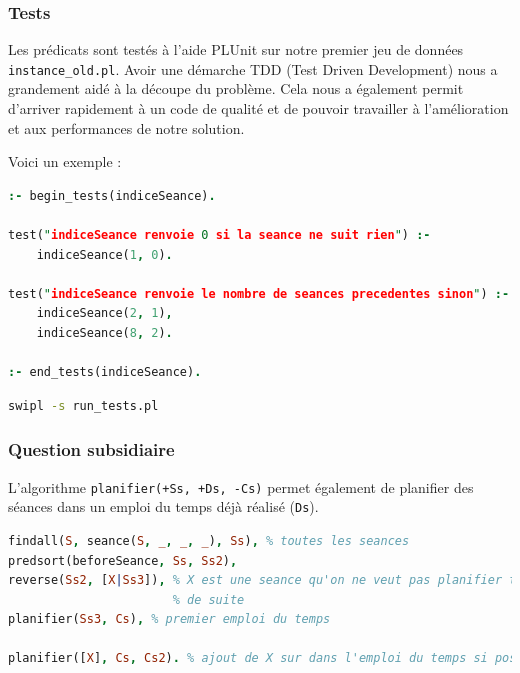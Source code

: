 \subsubsection{Tests}

Les prédicats sont testés à l'aide PLUnit sur notre premier jeu de données
\texttt{instance\_old.pl}. Avoir une démarche TDD (Test Driven Development) nous
a grandement aidé à la découpe du problème. Cela nous a également permit
d'arriver rapidement à un code de qualité et de pouvoir travailler à
l'amélioration et aux performances de notre solution.

Voici un exemple :

\begin{lstlisting}[language=Prolog, caption=Exemple de test, captionpos=b,
label={lst:test}]
:- begin_tests(indiceSeance).

test("indiceSeance renvoie 0 si la seance ne suit rien") :-
    indiceSeance(1, 0).

test("indiceSeance renvoie le nombre de seances precedentes sinon") :-
    indiceSeance(2, 1),
    indiceSeance(8, 2).

:- end_tests(indiceSeance).
\end{lstlisting}

\begin{lstlisting}[language=bash, caption=Lancer les tests, captionpos=b]
swipl -s run_tests.pl
\end{lstlisting}


\subsubsection{Question subsidiaire}

L'algorithme \texttt{planifier(+Ss, +Ds, -Cs)} permet également de planifier des
séances dans un emploi du temps déjà réalisé (\texttt{Ds}).

\begin{lstlisting}[language=Prolog, caption=Exemple d'ajout dans un EDT, captionpos=b,
label={lst:creneauValideCreneau}]
findall(S, seance(S, _, _, _), Ss), % toutes les seances
predsort(beforeSeance, Ss, Ss2),
reverse(Ss2, [X|Ss3]), % X est une seance qu'on ne veut pas planifier tout
                       % de suite
planifier(Ss3, Cs), % premier emploi du temps

planifier([X], Cs, Cs2). % ajout de X sur dans l'emploi du temps si possible
\end{lstlisting}

